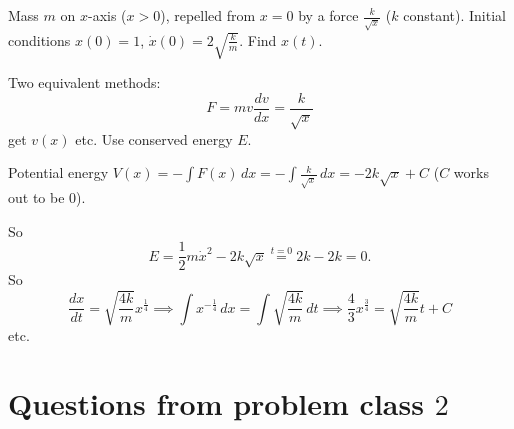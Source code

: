\documentclass[10pt, a4paper]{article}
\begin{document}
\begin{problem}
    Mass $m$ on $x$-axis
    ($x > 0$),
    repelled from $x = 0$ by a force $\frac{k}{\sqrt{x}}$
    ($k$ constant).
    Initial conditions $x(0) = 1$,
    $\dot{x}(0) = 2\sqrt{\frac{k}{m}}$.
    Find $x(t)$.

    \begin{solution}
        Two equivalent methods:
        \[
        F = mv\frac{dv}{dx} = \frac{k}{\sqrt{x}}
        \]
        get $v(x)$ etc.
        Use conserved energy $E$.

        Potential energy $V(x) = -\int F(x)\,dx = -\int\frac{k}{\sqrt{x}}\,dx = -2k\sqrt{x}+ C$
        ($C$ works out to be $0$).

        So
        \[
        E = \frac{1}{2}m\dot{x} ^ 2 - 2k\sqrt{x} \overset{t = 0}{=} 2k - 2k = 0.
        \]
        So
        \[
        \frac{dx}{dt} = \sqrt{\frac{4k}{m}}x ^ {\frac{1}{4}} \implies \int x ^ {-\frac{1}{4}}\,dx = \int\sqrt{\frac{4k}{m}}\,dt \implies \frac{4}{3}x ^ {\frac{3}{4}} = \sqrt{\frac{4k}{m}}t + C
        \]
        etc.
    \end{solution}
\end{problem}

\section{Questions from problem class \texorpdfstring{$2$}{}}
\end{document}
